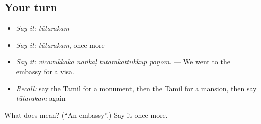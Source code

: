\subsection*{Your turn}
\begin{itemize}
\raggedright
  \item \emph{Say it:} \emph{tūtarakam}
  \item \emph{Say it:} \emph{tūtarakam}, once more
  \item \emph{Say it:} \emph{vicāvukkāka nāṅkaḷ tūtarakattukkup pōṉōm.} — We went to the embassy for a visa.
  \item \emph{Recall:} say the Tamil for a monument, then the Tamil for a mansion, then say \emph{tūtarakam} again
\end{itemize}

\begin{tcolorbox}[breakable,colback=teal!4,colframe=teal!35!black,title={Before you move on}]
What does  mean? (\textquotedblleft{}An embassy\textquotedblright{}.) Say it once more.
\end{tcolorbox}
